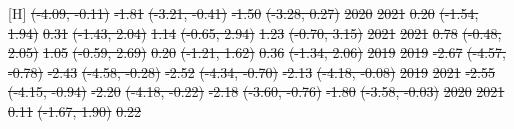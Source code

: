 \documentclass[
  letterpaper,
  DIV=11,
  numbers=noendperiod]{scrartcl}
\makeatletter
\renewenvironment{table}%
   {\renewcommand\familydefault\sfdefault
    \@float{table}}
   {\end@float}
\providecommand{\DIFdel}[1]{{\protect\color{red}\sout{#1}}}                      %
\providecommand{\DIFdelFL}[1]{\DIFdel{#1}} %
\makeatother
\begin{document}
\begin{table}[H]
\DIFdelFL{(-4.09, -0.11) }%
\DIFdelFL{-1.81 }%
\DIFdelFL{(-3.21, -0.41) }%
\DIFdelFL{-1.50 }%
\DIFdelFL{(-3.28, 0.27)}%
\DIFdelFL{\hspace{1em}2020 }%
\DIFdelFL{2021 }%
\DIFdelFL{0.20 }%
\DIFdelFL{(-1.54, 1.94) }%
\DIFdelFL{0.31 }%
\DIFdelFL{(-1.43, 2.04) }%
\DIFdelFL{1.14 }%
\DIFdelFL{(-0.65, 2.94) }%
\DIFdelFL{1.23 }%
\DIFdelFL{(-0.70, 3.15)}%
\DIFdelFL{\hspace{1em}2021 }%
\DIFdelFL{2021 }%
\DIFdelFL{0.78 }%
\DIFdelFL{(-0.48, 2.05) }%
\DIFdelFL{1.05 }%
\DIFdelFL{(-0.59, 2.69) }%
\DIFdelFL{0.20 }%
\DIFdelFL{(-1.21, 1.62) }%
\DIFdelFL{0.36 }%
\DIFdelFL{(-1.34, 2.06)}%
\DIFdelFL{\hspace{1em}2019 }%
\DIFdelFL{2019 }%
\DIFdelFL{-2.67 }%
\DIFdelFL{(-4.57, -0.78) }%
\DIFdelFL{-2.43 }%
\DIFdelFL{(-4.58, -0.28) }%
\DIFdelFL{-2.52 }%
\DIFdelFL{(-4.34, -0.70) }%
\DIFdelFL{-2.13 }%
\DIFdelFL{(-4.18, -0.08)}%
\DIFdelFL{\hspace{1em}2019 }%
\DIFdelFL{2021 }%
\DIFdelFL{-2.55 }%
\DIFdelFL{(-4.15, -0.94) }%
\DIFdelFL{-2.20 }%
\DIFdelFL{(-4.18, -0.22) }%
\DIFdelFL{-2.18 }%
\DIFdelFL{(-3.60, -0.76) }%
\DIFdelFL{-1.80 }%
\DIFdelFL{(-3.58, -0.03)}%
\DIFdelFL{\hspace{1em}2020 }%
\DIFdelFL{2021 }%
\DIFdelFL{0.11 }%
\DIFdelFL{(-1.67, 1.90) }%
\DIFdelFL{0.22 }%

\end{table}
\end{document}

